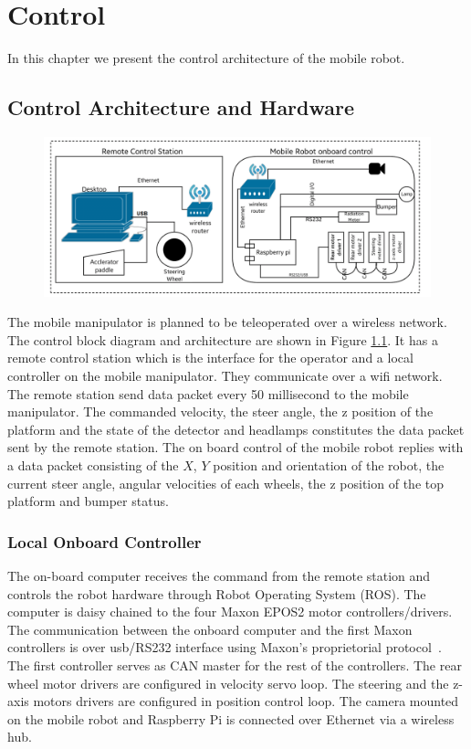 \chapter{Control }
\label{c5_DI2}
In this chapter we present the control architecture of the mobile robot.  
\section{Control Architecture and Hardware}


\begin{figure}
	\includegraphics[width=\linewidth,keepaspectratio]{Chapter3/fig/controlblock}
	\label{fig:ControlBlockDiag} 
\end{figure} 
The mobile manipulator is planned to be teleoperated over a wireless network. The control block diagram and architecture are shown in Figure \ref{fig:ControlBlockDiag}. It has a remote control station which is the interface for the operator and a local controller on the mobile manipulator. They  communicate over a wifi network. The remote station send data packet every 50 millisecond to the mobile manipulator. The commanded velocity, the steer angle, the z position of the platform and the state of the detector and headlamps constitutes the data packet sent by the remote station. The on board control of the mobile robot replies with a data packet consisting of the $X$, $Y$ position and orientation of the robot, the current steer angle, angular velocities of each wheels, the z position of the top platform and bumper status.

\subsection{Local Onboard Controller}
The  on-board computer receives the command from the remote station and controls the robot hardware through Robot Operating System (ROS).
The computer is daisy chained to the four Maxon EPOS2 motor controllers/drivers. The communication between the onboard computer and the first Maxon controllers is over usb/RS232 interface using Maxon's proprietorial protocol~\cite{maxonrs232}. The first controller serves as CAN master for the rest of the controllers. The rear wheel motor drivers are configured in velocity servo loop. The steering and the z-axis motors drivers are configured in position control loop.  The camera mounted on the mobile robot  and Raspberry Pi  is connected over Ethernet via a wireless hub. 

